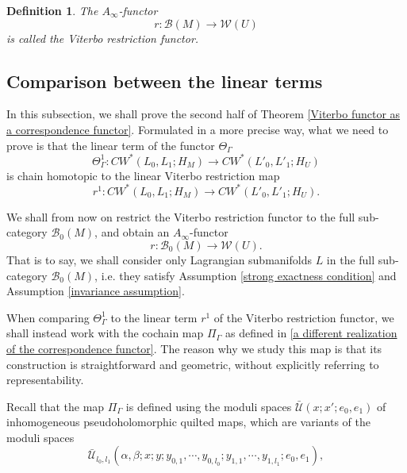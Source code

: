 \documentclass{amsart}
\newtheorem{definition}[theorem]{Definition}
\numberwithin{equation}{section}
\numberwithin{figure}{section}
\begin{document}
\begin{definition}
	The $A_{\infty}$-functor 
\begin{equation*}
r: \mathcal{B}(M) \to \mathcal{W}(U)
\end{equation*}
is called the Viterbo restriction functor.
\end{definition}

\subsection{Comparison between the linear terms}\label{section: comparing the two linear restriction functors}
	In this subsection, we shall prove the second half of Theorem \ref{Viterbo functor as a correspondence functor}. Formulated in a more precise way, what we need to prove is that the linear term of the functor $\Theta_{\Gamma}$
\begin{equation*}
\Theta_{\Gamma}^{1}: CW^{*}(L_{0}, L_{1}; H_{M}) \to CW^{*}(L'_{0}, L'_{1}; H_{U})
\end{equation*}
is chain homotopic to the linear Viterbo restriction map
\begin{equation*}
r^{1}: CW^{*}(L_{0}, L_{1}; H_{M}) \to CW^{*}(L'_{0}, L'_{1}; H_{U}).
\end{equation*} \par
	We shall from now on restrict the Viterbo restriction functor to the full sub-category $\mathcal{B}_{0}(M)$, and obtain an $A_{\infty}$-functor
\begin{equation*}
r: \mathcal{B}_{0}(M) \to \mathcal{W}(U).
\end{equation*}
That is to say, we shall consider only Lagrangian submanifolds $L$ in the full sub-category $\mathcal{B}_{0}(M)$, i.e. they satisfy Assumption \ref{strong exactness condition} and Assumption \ref{invariance assumption}. \par
	When comparing $\Theta_{\Gamma}^{1}$ to the linear term $r^{1}$ of the Viterbo restriction functor, we shall instead work with the cochain map $\Pi_\Gamma$ as defined in \eqref{a different realization of the correspondence functor}. 
The reason why we study this map is that its construction is straightforward and geometric, without explicitly referring to representability. \par
	Recall that the map $\Pi_{\Gamma}$ is defined using the moduli spaces
$\bar{\mathcal{U}}(x; x'; e_{0}, e_{1})$ of inhomogeneous pseudoholomorphic quilted maps, which are variants of the moduli spaces
\begin{equation*}
\bar{\mathcal{U}}_{l_{0}, l_{1}}(\alpha, \beta; x; y; y_{0, 1}, \cdots, y_{0, l_{0}}; y_{1, 1}, \cdots, y_{1, l_{1}}; e_{0}, e_{1}),
\end{equation*}
\end{document}
